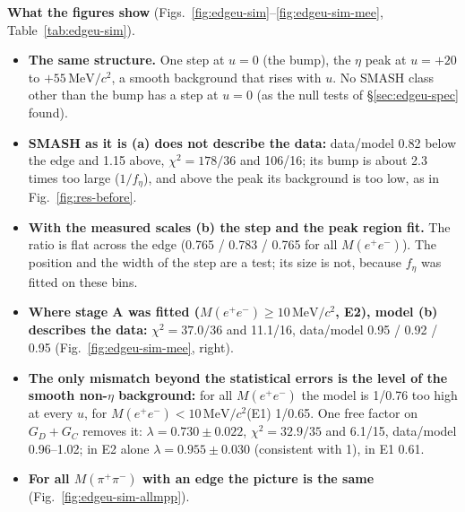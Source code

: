 \documentclass[11pt,a4paper]{article}
\newcommand{\Mee}{\ensuremath{M(e^{+}e^{-})}\xspace}
\newcommand{\Mpipi}{\ensuremath{M(\pi^{+}\pi^{-})}\xspace}
\newcommand{\MeVcc}{\ensuremath{\mathrm{MeV}/c^{2}}\xspace}
\begin{document}
\textbf{What the figures show} (Figs.~\ref{fig:edgeu-sim}--\ref{fig:edgeu-sim-mee}, Table~\ref{tab:edgeu-sim}).
\begin{itemize}\setlength{\itemsep}{1pt}
\item \textbf{The same structure.} One step at $u=0$ (the bump), the $\eta$ peak at $u=+20$ to $+55$\,\MeVcc, a smooth background that rises with
      $u$. No SMASH class other than the bump has a step at $u=0$ (as the null tests of \S\ref{sec:edgeu-spec} found).
\item \textbf{SMASH as it is (a) does not describe the data:} data/model 0.82 below the edge and 1.15 above, $\chi^2=178/36$ and 106/16; its bump
      is about 2.3 times too large ($1/f_\eta$), and above the peak its background is too low, as in Fig.~\ref{fig:res-before}.
\item \textbf{With the measured scales (b) the step and the peak region fit.} The ratio is flat across the edge (0.765 / 0.783 / 0.765 for all
      \Mee). The position and the width of the step are a test; its size is not, because $f_\eta$ was fitted on these bins.
\item \textbf{Where stage A was fitted (\Mee$\ge10$\,\MeVcc, E2), model (b) describes the data:} $\chi^2=37.0/36$ and 11.1/16, data/model
      0.95 / 0.92 / 0.95 (Fig.~\ref{fig:edgeu-sim-mee}, right).
\item \textbf{The only mismatch beyond the statistical errors is the level of the smooth non-$\eta$ background:} for all \Mee the model is
      1/0.76 too high at every $u$, for \Mee$<10$\,\MeVcc (E1) 1/0.65. One free factor on $G_D+G_C$ removes it: $\lambda=0.730\pm0.022$,
      $\chi^2=32.9/35$ and 6.1/15, data/model 0.96--1.02; in E2 alone $\lambda=0.955\pm0.030$ (consistent with 1), in E1 0.61.
\item \textbf{For all \Mpipi with an edge the picture is the same} (Fig.~\ref{fig:edgeu-sim-allmpp}).
\end{itemize}
\end{document}
